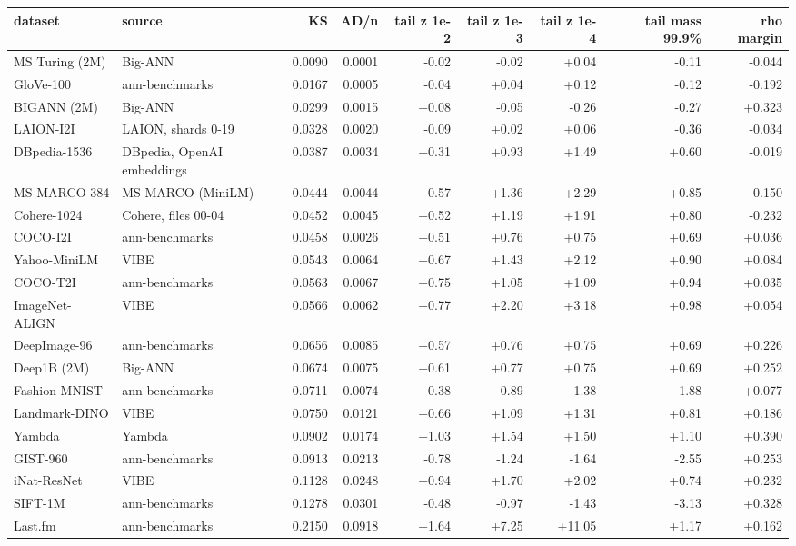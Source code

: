 \begin{tabular}{llrrrrrrr}
\toprule
dataset & source & KS & AD/n & tail z 1e-2 & tail z 1e-3 & tail z 1e-4 & tail mass 99.9\% & rho margin \\
\midrule
MS Turing (2M) & Big-ANN & 0.0090 & 0.0001 & -0.02 & -0.02 & +0.04 & -0.11 & -0.044 \\
GloVe-100 & ann-benchmarks & 0.0167 & 0.0005 & -0.04 & +0.04 & +0.12 & -0.12 & -0.192 \\
BIGANN (2M) & Big-ANN & 0.0299 & 0.0015 & +0.08 & -0.05 & -0.26 & -0.27 & +0.323 \\
LAION-I2I & LAION, shards 0-19 & 0.0328 & 0.0020 & -0.09 & +0.02 & +0.06 & -0.36 & -0.034 \\
DBpedia-1536 & DBpedia, OpenAI embeddings & 0.0387 & 0.0034 & +0.31 & +0.93 & +1.49 & +0.60 & -0.019 \\
MS MARCO-384 & MS MARCO (MiniLM) & 0.0444 & 0.0044 & +0.57 & +1.36 & +2.29 & +0.85 & -0.150 \\
Cohere-1024 & Cohere, files 00-04 & 0.0452 & 0.0045 & +0.52 & +1.19 & +1.91 & +0.80 & -0.232 \\
COCO-I2I & ann-benchmarks & 0.0458 & 0.0026 & +0.51 & +0.76 & +0.75 & +0.69 & +0.036 \\
Yahoo-MiniLM & VIBE & 0.0543 & 0.0064 & +0.67 & +1.43 & +2.12 & +0.90 & +0.084 \\
COCO-T2I & ann-benchmarks & 0.0563 & 0.0067 & +0.75 & +1.05 & +1.09 & +0.94 & +0.035 \\
ImageNet-ALIGN & VIBE & 0.0566 & 0.0062 & +0.77 & +2.20 & +3.18 & +0.98 & +0.054 \\
DeepImage-96 & ann-benchmarks & 0.0656 & 0.0085 & +0.57 & +0.76 & +0.75 & +0.69 & +0.226 \\
Deep1B (2M) & Big-ANN & 0.0674 & 0.0075 & +0.61 & +0.77 & +0.75 & +0.69 & +0.252 \\
Fashion-MNIST & ann-benchmarks & 0.0711 & 0.0074 & -0.38 & -0.89 & -1.38 & -1.88 & +0.077 \\
Landmark-DINO & VIBE & 0.0750 & 0.0121 & +0.66 & +1.09 & +1.31 & +0.81 & +0.186 \\
Yambda & Yambda & 0.0902 & 0.0174 & +1.03 & +1.54 & +1.50 & +1.10 & +0.390 \\
GIST-960 & ann-benchmarks & 0.0913 & 0.0213 & -0.78 & -1.24 & -1.64 & -2.55 & +0.253 \\
iNat-ResNet & VIBE & 0.1128 & 0.0248 & +0.94 & +1.70 & +2.02 & +0.74 & +0.232 \\
SIFT-1M & ann-benchmarks & 0.1278 & 0.0301 & -0.48 & -0.97 & -1.43 & -3.13 & +0.328 \\
Last.fm & ann-benchmarks & 0.2150 & 0.0918 & +1.64 & +7.25 & +11.05 & +1.17 & +0.162 \\
\bottomrule
\end{tabular}
